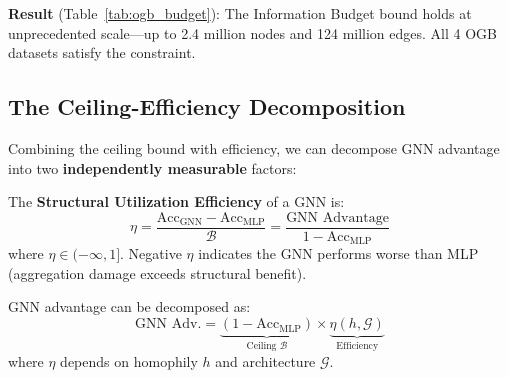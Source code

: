 \textbf{Result} (Table~\ref{tab:ogb_budget}): The Information Budget bound holds at unprecedented scale---up to 2.4 million nodes and 124 million edges. All 4 OGB datasets satisfy the constraint.

\subsection{The Ceiling-Efficiency Decomposition}
\label{subsec:decomposition}

Combining the ceiling bound with efficiency, we can decompose GNN advantage into two \textbf{independently measurable} factors:

\begin{definition}
\label{def:efficiency}
The \textbf{Structural Utilization Efficiency} of a GNN is:
\begin{equation}
    \eta = \frac{\text{Acc}_{\text{GNN}} - \text{Acc}_{\text{MLP}}}{\mathcal{B}} = \frac{\text{GNN Advantage}}{1 - \text{Acc}_{\text{MLP}}}
\end{equation}
where $\eta \in (-\infty, 1]$. Negative $\eta$ indicates the GNN performs worse than MLP (aggregation damage exceeds structural benefit).
\end{definition}

\begin{proposition}
\label{prop:decomposition}
GNN advantage can be decomposed as:
\begin{equation}
    \text{GNN Adv.} = \underbrace{(1 - \text{Acc}_{\text{MLP}})}_{\text{Ceiling } \mathcal{B}} \times \underbrace{\eta(h, \mathcal{G})}_{\text{Efficiency}}
\end{equation}
where $\eta$ depends on homophily $h$ and architecture $\mathcal{G}$.
\end{proposition}

